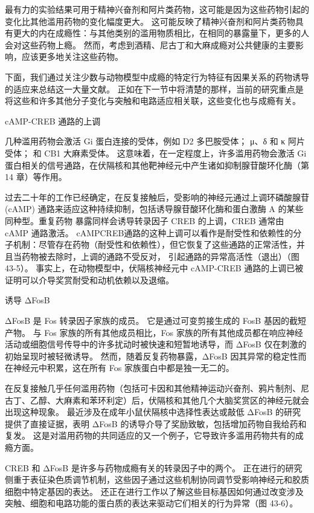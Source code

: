 最有力的实验结果可用于精神兴奋剂和阿片类药物，这可能是因为这些药物引起的变化比其他滥用药物的变化幅度更大。 这可能反映了精神兴奋剂和阿片类药物具有更大的内在成瘾性：与其他类别的滥用物质相比，在相同的暴露量下，更多的人会对这些药物上瘾。 然而，考虑到酒精、尼古丁和大麻成瘾对公共健康的主要影响，应该更多地关注这些药物。

下面，我们通过关注少数与动物模型中成瘾的特定行为特征有因果关系的药物诱导的适应来总结这一大量文献。 正如在下一节中将清楚的那样，当前的研究重点是将这些和许多其他分子变化与突触和电路适应相关联，这些变化也与成瘾有关。

cAMP-CREB 通路的上调

几种滥用药物会激活 Gi 蛋白连接的受体，例如 D2 多巴胺受体； μ、δ 和 κ 阿片受体； 和 CB1 大麻素受体。 这意味着，在一定程度上，许多滥用药物会激活 Gi 蛋白相关的信号通路，在伏隔核和其他靶神经元中产生诸如抑制腺苷酸环化酶（第 14 章）等作用。

过去二十年的工作已经确定，在反复接触后，受影响的神经元通过上调环磷酸腺苷 (cAMP) 通路来适应这种持续抑制，包括诱导腺苷酸环化酶和蛋白激酶 A 的某些同种型。重复药物 暴露同样会诱导转录因子 CREB 的上调，CREB 通常由 cAMP 通路激活。 cAMPCREB通路的这种上调可以看作是耐受性和依赖性的分子机制：尽管存在药物（耐受性和依赖性），但它恢复了这些通路的正常活性，并且当药物被去除时，上调的通路不受反对， 引起通路的异常高活性（退出）（图 43-5）。 事实上，在动物模型中，伏隔核神经元中 cAMP-CREB 通路的上调已被证明可以介导奖赏耐受和动机依赖以及退缩。

诱导 ΔFosB

ΔFosB 是 Fos 转录因子家族的成员。 它是通过可变剪接生成的 FosB 基因的截短产物。 与 Fos 家族的所有其他成员相比，Fos 家族的所有其他成员都在响应神经活动或细胞信号传导中的许多扰动时被快速和短暂地诱导，而 ΔFosB 仅在刺激的初始呈现时被轻微诱导。 然而，随着反复药物暴露，ΔFosB 因其异常的稳定性而在神经元中积累，这在所有 Fos 家族蛋白中都是独一无二的。

在反复接触几乎任何滥用药物（包括可卡因和其他精神运动兴奋剂、鸦片制剂、尼古丁、乙醇、大麻素和苯环利定）后，伏隔核和其他几个大脑奖赏区的神经元就会出现这种现象。 最近涉及在成年小鼠伏隔核中选择性表达或敲低 ΔFosB 的研究提供了直接证据，表明 ΔFosB 的诱导介导了奖励致敏，包括增加药物自我给药和复发。 这是对滥用药物的共同适应的又一个例子，它导致许多滥用药物共有的成瘾方面。

CREB 和 ΔFosB 是许多与药物成瘾有关的转录因子中的两个。 正在进行的研究侧重于表征染色质调节机制，这些因子通过这些机制协同调节受影响神经元和胶质细胞中特定基因的表达。 还正在进行工作以了解这些目标基因如何通过改变涉及突触、细胞和电路功能的蛋白质的表达来驱动它们相关的行为异常（图 43-6）。

